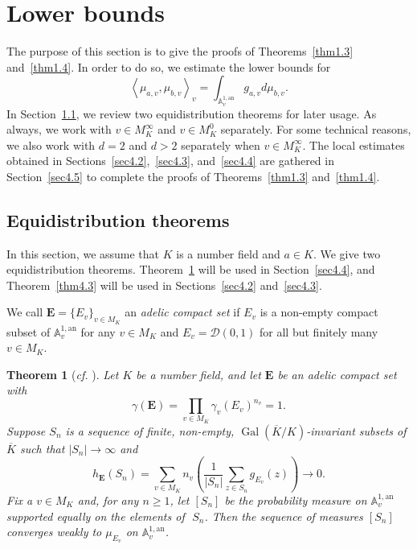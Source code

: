 \documentclass[10pt,a4paper]{amsart}
\numberwithin{equation}{section}
\theoremstyle{plain}
\newtheorem{thm}{Theorem}[section]
\theoremstyle{definition}
\theoremstyle{remark}
\DeclareMathOperator{\Gal}{Gal}
\newcommand{\A}{\mathbb A}
\newcommand{\an}{\mathrm{an}}
\renewcommand{\bar}{\overline}
\begin{document}
\section{Lower bounds}\label{sec4}

The purpose of this section is to give the proofs of Theorems~\ref{thm1.3}
and~\ref{thm1.4}. In order to do so, we estimate the lower bounds
for
\[
\left\langle \mu_{a,v},\mu_{b,v}\right\rangle _{v}=\int_{\A_{v}^{1,\an}}g_{a,v}d\mu_{b,v}.
\]
In Section~\ref{sec4.1}, we review two equidistribution theorems
for later usage. As always, we work with $v\in M_{K}^{\infty}$ and
$v\in M_{K}^{0}$ separately. For some technical reasons, we also
work with $d=2$ and $d>2$ separately when $v\in M_{K}^{\infty}$.
The local estimates obtained in Sections~\ref{sec4.2},~\ref{sec4.3},
and~\ref{sec4.4} are gathered in Section~\ref{sec4.5} to complete
the proofs of Theorems~\ref{thm1.3} and~\ref{thm1.4}.

\subsection{Equidistribution theorems}\label{sec4.1}

In this section, we assume that $K$ is a number field and $a\in K$.
We give two equidistribution theorems. Theorem~\ref{thm4.1} will
be used in Section~\ref{sec4.4}, and Theorem~\ref{thm4.3} will be
used in Sections~\ref{sec4.2} and~\ref{sec4.3}.

We call $\boldsymbol{E}=\{E_{v}\}_{v\in M_{K}}$ an \textit{adelic
compact set} if $E_{v}$ is a non-empty compact subset of $\A_{v}^{1,\an}$
for any $v\in M_{K}$ and $E_{v}=\mathcal{D}(0,1)$ for all but finitely
many $v\in M_{K}$.

\begin{thm}[\textit{cf.} {\cite[Theorem 7.52]{BR2}}]\label{thm4.1}
Let $K$ be a number field, and let $\boldsymbol{E}$ be an adelic compact set with
\[
\gamma(\boldsymbol{E})=\prod_{v\in M_{K}}\gamma_{v}(E_{v})^{n_{v}}=1.
\]
Suppose $S_{n}$ is a sequence of finite, non-empty, $\Gal(\bar{K}/K)$-invariant
subsets of\, $\bar{K}$ such that $|S_{n}|\to\infty$ and
\[
h_{\boldsymbol{E}}(S_{n})=\sum_{v\in M_{K}}n_{v}\left(\frac{1}{|S_{n}|}\sum_{z\in S_{n}}g_{E_{v}}(z)\right)\longrightarrow 0.
\]
Fix a $v\in M_{K}$ and, for any $n\geq1$, let $[S_{n}]$ be the probability
measure on $\A_{v}^{1,\an}$ supported equally on
the elements of\,~$S_{n}$. Then the sequence of measures $[S_{n}]$
converges weakly to $\mu_{E_{v}}$ on $\A_{v}^{1,\an}$.
\end{thm}
\end{document}
